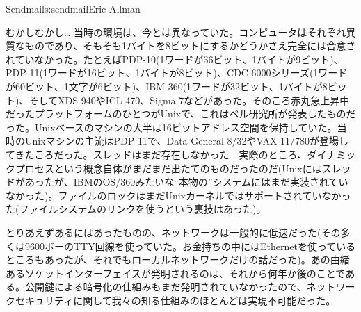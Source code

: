 \begin{aosachapter}{Sendmail}{s:sendmail}{Eric Allman}
\begin{aosasect1}{むかしむかし\ldots}
当時の環境は、今とは異なっていた。コンピュータはそれぞれ異質なものであり、そもそも1バイトを8ビットにするかどうかさえ完全には合意されていなかった。たとえばPDP-10(1ワードが36ビット、1バイトが9ビット)、PDP-11(1ワードが16ビット、1バイトが8ビット)、CDC 6000シリーズ(1ワードが60ビット、1文字が6ビット)、IBM 360(1ワードが32ビット、1バイトが8ビット)、そしてXDS 940やICL 470、Sigma 7などがあった。そのころ赤丸急上昇中だったプラットフォームのひとつがUnixで、これはベル研究所が発表したものだった。Unixベースのマシンの大半は16ビットアドレス空間を保持していた。当時のUnixマシンの主流はPDP-11で、Data General 8/32やVAX-11/780が登場してきたころだった。スレッドはまだ存在しなかった---実際のところ、ダイナミックプロセスという概念自体がまだまだ出たてのものだったのだ(Unixにはスレッドがあったが、IBMのOS/360みたいな``本物の''システムにはまだ実装されていなかった)。ファイルのロックはまだUnixカーネルではサポートされていなかった(ファイルシステムのリンクを使うという裏技はあった)。

とりあえずあるにはあったものの、ネットワークは一般的に低速だった(その多くは9600ボーのTTY回線を使っていた。お金持ちの中にはEthernetを使っているところもあったが、それでもローカルネットワークだけの話だった)。あの由緒あるソケットインターフェイスが発明されるのは、それから何年か後のことである。公開鍵による暗号化の仕組みもまだ発明されていなかったので、ネットワークセキュリティに関して我々の知る仕組みのほとんどは実現不可能だった。


\end{aosasect1}
\end{aosachapter}

